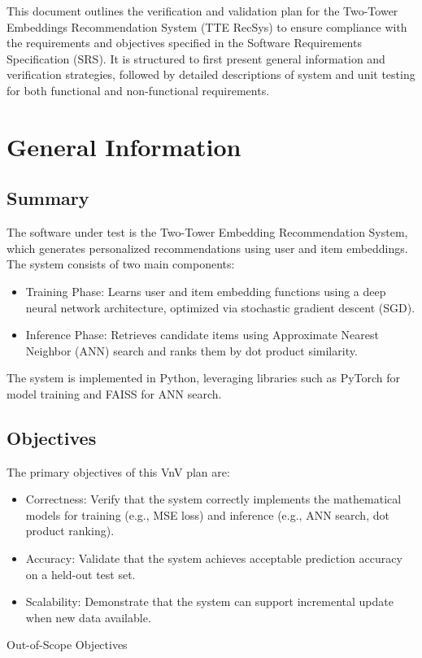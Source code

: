 \documentclass[12pt, titlepage]{article}
\begin{document}
\newpage


This document outlines the verification and validation plan for the Two-Tower Embeddings Recommendation System (TTE RecSys) to ensure compliance with the requirements and objectives specified in the Software Requirements Specification (SRS). It is structured to first present general information and verification strategies, followed by detailed descriptions of system and unit testing for both functional and non-functional requirements.

\section{General Information}

\subsection{Summary}

The software under test is the Two-Tower Embedding Recommendation System, which generates personalized recommendations using user and item embeddings. The system consists of two main components:
\begin{itemize}
  \item Training Phase: Learns user and item embedding functions using a deep neural network architecture, optimized via stochastic gradient descent (SGD).
  \item Inference Phase: Retrieves candidate items using Approximate Nearest Neighbor (ANN) search and ranks them by dot product similarity.
\end{itemize}

The system is implemented in Python, leveraging libraries such as PyTorch for model training and FAISS for ANN search.

\subsection{Objectives}
The primary objectives of this VnV plan are:
\begin{itemize}
  \item Correctness: Verify that the system correctly implements the mathematical models for training (e.g., MSE loss) and inference (e.g., ANN search, dot product ranking).
  \item Accuracy: Validate that the system achieves acceptable prediction accuracy on a held-out test set.
  \item Scalability: Demonstrate that the system can support incremental update when new data available.
\end{itemize}
\noindent Out-of-Scope Objectives
\end{document}
